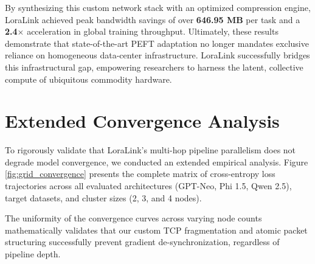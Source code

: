 \documentclass{ieeeaccess}
\begin{document}
By synthesizing this custom network stack with an optimized compression engine, LoraLink achieved peak bandwidth savings of over \textbf{646.95 MB} per task and a \textbf{2.4$\times$} acceleration in global training throughput. Ultimately, these results demonstrate that state-of-the-art PEFT adaptation no longer mandates exclusive reliance on homogeneous data-center infrastructure. LoraLink successfully bridges this infrastructural gap, empowering researchers to harness the latent, collective compute of ubiquitous commodity hardware.



\clearpage
\appendices

\section{Extended Convergence Analysis}
\label{app:convergence}
To rigorously validate that LoraLink's multi-hop pipeline parallelism does not degrade model convergence, we conducted an extended empirical analysis. Figure \ref{fig:grid_convergence} presents the complete matrix of cross-entropy loss trajectories across all evaluated architectures (GPT-Neo, Phi 1.5, Qwen 2.5), target datasets, and cluster sizes (2, 3, and 4 nodes).

The uniformity of the convergence curves across varying node counts mathematically validates that our custom TCP fragmentation and atomic packet structuring successfully prevent gradient de-synchronization, regardless of pipeline depth.
\end{document}
